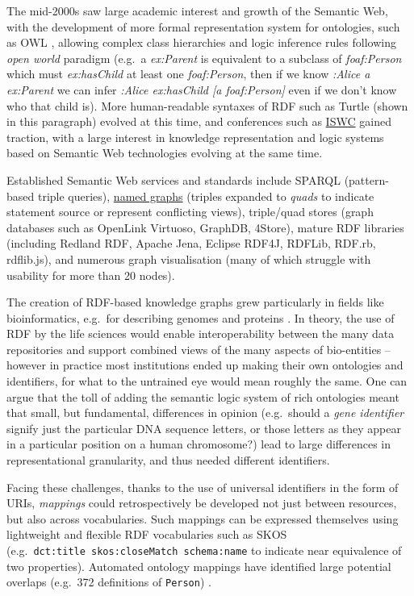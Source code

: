 \documentclass[fleqn,10pt,NOlineno]{wlpeerjlua}
\begin{document}
The mid-2000s saw large academic interest and growth of the Semantic Web, with the development of more formal representation system for ontologies, such as OWL \autocite{w3-owl2-overview}, allowing complex class hierarchies and logic inference rules following \emph{open world} paradigm (e.g.~a \emph{ex:Parent} is equivalent to a subclass of \emph{foaf:Person} which must \emph{ex:hasChild} at least one \emph{foaf:Person}, then if we know \emph{:Alice a ex:Parent} we can infer \emph{:Alice ex:hasChild {[}a foaf:Person{]}} even if we don't know who that child is). More human-readable syntaxes of RDF such as Turtle (shown in this paragraph) evolved at this time, and conferences such as \href{https://iswc2022.semanticweb.org/}{ISWC} \autocite{horrocksSemanticWebISWC2002} gained traction, with a large interest in knowledge representation and logic systems based on Semantic Web technologies evolving at the same time.

Established Semantic Web services and standards include SPARQL \autocite{w3-sparql11-overview} (pattern-based triple queries), \href{https://www.w3.org/TR/rdf11-concepts/\#section-dataset}{named graphs} \autocite{w3-rdf11-concepts} (triples expanded to \emph{quads} to indicate statement source or represent conflicting views), triple/quad stores (graph databases such as OpenLink Virtuoso, GraphDB, 4Store), mature RDF libraries (including Redland RDF, Apache Jena, Eclipse RDF4J, RDFLib, RDF.rb, rdflib.js), and numerous graph visualisation (many of which struggle with usability for more than 20 nodes).

The creation of RDF-based knowledge graphs grew particularly in fields like bioinformatics, e.g.~for describing genomes and proteins \autocite{gobleStateNationData2008c,williamsOpenPHACTSSemantic2012c}. In theory, the use of RDF by the life sciences would enable interoperability between the many data repositories and support combined views of the many aspects of bio-entities -- however in practice most institutions ended up making their own ontologies and identifiers, for what to the untrained eye would mean roughly the same. One can argue that the toll of adding the semantic logic system of rich ontologies meant that small, but fundamental, differences in opinion (e.g.~should a \emph{gene identifier} signify just the particular DNA sequence letters, or those letters as they appear in a particular position on a human chromosome?) lead to large differences in representational granularity, and thus needed different identifiers.

Facing these challenges, thanks to the use of universal identifiers in the form of URIs, \emph{mappings} could retrospectively be developed not just between resources, but also across vocabularies. Such mappings can be expressed themselves using lightweight and flexible RDF vocabularies such as SKOS \autocite{w3-skos-primer} (e.g.~\texttt{dct:title\ skos:closeMatch\ schema:name} to indicate near equivalence of two properties). Automated ontology mappings have identified large potential overlaps (e.g.~372 definitions of \texttt{Person}) \autocite{huHowMatchableAre2011a} .
\end{document}
